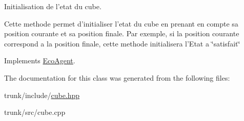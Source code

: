 Initialisation de l'etat du cube. 

Cette methode permet d'initialiser l'etat du cube en prenant en compte sa position courante et sa position finale. Par exemple, si la position courante correspond a la position finale, cette methode initialisera l'Etat a \char`\"{}satisfait\char`\"{} 

Implements \hyperlink{classEcoAgent_f779fd214bed010d0f6b7b137fde7116}{EcoAgent}.

The documentation for this class was generated from the following files:\begin{CompactItemize}
\item 
trunk/include/\hyperlink{cube_8hpp}{cube.hpp}\item 
trunk/src/cube.cpp\end{CompactItemize}
